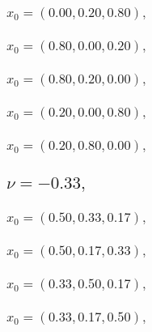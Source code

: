 \documentclass[a4paper]{article}
\begin{document}
\begin{multicols*}{2}
   \subsubsection{\(x_0 = (0.00,0.20,0.80),\quad \)}
   

   \subsubsection{\(x_0 = (0.80,0.00,0.20),\quad \)}
   

   \subsubsection{\(x_0 = (0.80,0.20,0.00),\quad \)}
   

   \subsubsection{\(x_0 = (0.20,0.00,0.80),\quad \)}
   

   \subsubsection{\(x_0 = (0.20,0.80,0.00),\quad \)}
   

   \subsection{\(\nu = -0.33,\quad \)}
   

   \subsubsection{\(x_0 = (0.50,0.33,0.17),\quad \)}
   

   \subsubsection{\(x_0 = (0.50,0.17,0.33),\quad \)}
   

   \subsubsection{\(x_0 = (0.33,0.50,0.17),\quad \)}
   

   \subsubsection{\(x_0 = (0.33,0.17,0.50),\quad \)}
   


\end{multicols*}
\end{document}
